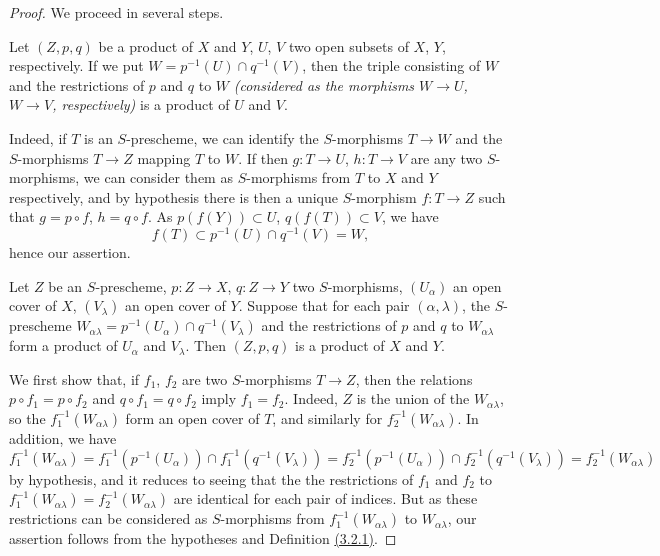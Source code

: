 \begin{proof}
\label{proof-thm-1.3.2.6}
We proceed in several steps.

\begin{lem}[3.2.6.1]
\label{lem-1.3.2.6.1}
Let $(Z,p,q)$ be a product of $X$ and $Y$, $U$, $V$ two open subsets of $X$, $Y$,
respectively. If we put $W=p^{-1}(U)\cap q^{-1}(V)$, then the triple consisting of $W$ and
the restrictions of $p$ and $q$ to $W$ {\em (considered as the morphisms $W\to U$, $W\to V$,
respectively)} is a product of $U$ and $V$.
\end{lem}

Indeed, if $T$ is an $S$-prescheme, we can identify the $S$-morphisms $T\to W$ and the
$S$-morphisms $T\to Z$ mapping $T$ to $W$. If then $g:T\to U$, $h:T\to V$ are any two
$S$-morphisms, we can consider them as $S$-morphisms from $T$ to $X$ and $Y$ respectively,
and by hypothesis there is then a unique $S$-morphism $f:T\to Z$ such that $g=p\circ f$,
$h=q\circ f$. As $p(f(Y))\subset U$, $q(f(T))\subset V$, we have
\[
  f(T)\subset p^{-1}(U)\cap q^{-1}(V)=W,
\]
hence our assertion.

\begin{lem}[3.2.6.2]
\label{lem-1.3.2.6.2}
Let $Z$ be an $S$-prescheme, $p:Z\to X$, $q:Z\to Y$ two $S$-morphisms, $(U_\alpha)$ an open
cover of $X$, $(V_\lambda)$ an open cover of $Y$. Suppose that for each pair
$(\alpha,\lambda)$, the $S$-prescheme
$W_{\alpha\lambda}=p^{-1}(U_\alpha)\cap q^{-1}(V_\lambda)$ and the restrictions of $p$ and
$q$ to $W_{\alpha\lambda}$ form a product of $U_\alpha$ and $V_\lambda$. Then $(Z,p,q)$ is a
product of $X$ and $Y$.
\end{lem}

We first show that, if $f_1$, $f_2$ are two $S$-morphisms $T\to Z$, then the relations
$p\circ f_1=p\circ f_2$ and $q\circ f_1=q\circ f_2$ imply $f_1=f_2$. Indeed, $Z$ is the union
of the $W_{\alpha\lambda}$, so the $f_1^{-1}(W_{\alpha\lambda})$ form an open cover of $T$,
and similarly for $f_2^{-1}(W_{\alpha\lambda})$. In addition, we have
\[
  f_1^{-1}(W_{\alpha\lambda})=f_1^{-1}(p^{-1}(U_\alpha))\cap f_1^{-1}(q^{-1}(V_\lambda))
  =f_2^{-1}(p^{-1}(U_\alpha))\cap f_2^{-1}(q^{-1}(V_\lambda))=f_2^{-1}(W_{\alpha\lambda})
\]
by hypothesis, and it reduces to seeing that the the restrictions of $f_1$ and $f_2$ to
$f_1^{-1}(W_{\alpha\lambda})=f_2^{-1}(W_{\alpha\lambda})$ are identical for each pair of
indices. But as these restrictions can be considered as $S$-morphisms from
$f_1^{-1}(W_{\alpha\lambda})$ to $W_{\alpha\lambda}$, our assertion follows from the
hypotheses and Definition \hyperref[defn-1.3.2.1]{(3.2.1)}.


\end{proof}
